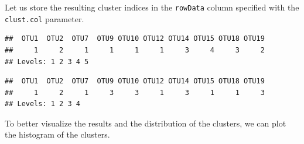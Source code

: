 \documentclass[
]{book}
\newenvironment{Shaded}{\begin{snugshade}}{\end{snugshade}}
\newcommand{\CommentTok}[1]{\textcolor[rgb]{0.56,0.35,0.01}{\textit{#1}}}
\newcommand{\DecValTok}[1]{\textcolor[rgb]{0.00,0.00,0.81}{#1}}
\newcommand{\FunctionTok}[1]{\textcolor[rgb]{0.00,0.00,0.00}{#1}}
\newcommand{\NormalTok}[1]{#1}
\newcommand{\OtherTok}[1]{\textcolor[rgb]{0.56,0.35,0.01}{#1}}
\newcommand{\SpecialCharTok}[1]{\textcolor[rgb]{0.00,0.00,0.00}{#1}}
\begin{document}
Let us store the resulting cluster indices in the \texttt{rowData} column specified
with the \texttt{clust.col} parameter.

\begin{Shaded}
\end{Shaded}

\begin{verbatim}
##  OTU1  OTU2  OTU7  OTU9 OTU10 OTU12 OTU14 OTU15 OTU18 OTU19 
##     1     2     1     1     1     1     3     4     3     2 
## Levels: 1 2 3 4 5
\end{verbatim}

\begin{Shaded}
\end{Shaded}

\begin{verbatim}
##  OTU1  OTU2  OTU7  OTU9 OTU10 OTU12 OTU14 OTU15 OTU18 OTU19 
##     1     2     1     3     3     1     3     1     1     3 
## Levels: 1 2 3 4
\end{verbatim}

To better visualize the results and the distribution of the clusters, we can
plot the histogram of the clusters.
\end{document}
